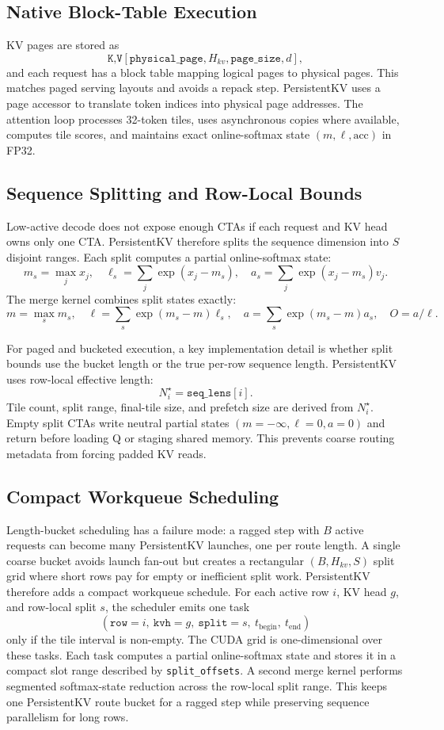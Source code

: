 \documentclass[10pt]{article}
\begin{document}
\subsection{Native Block-Table Execution}

KV pages are stored as
\[
\texttt{K,V}[\texttt{physical\_page}, H_{kv}, \texttt{page\_size}, d],
\]
and each request has a block table mapping logical pages to physical pages.
This matches paged serving layouts and avoids a repack step. PersistentKV uses
a page accessor to translate token indices into physical page addresses. The
attention loop processes 32-token tiles, uses asynchronous copies where
available, computes tile scores, and maintains exact online-softmax state
$(m,\ell,\mathrm{acc})$ in FP32.

\subsection{Sequence Splitting and Row-Local Bounds}

Low-active decode does not expose enough CTAs if each request and KV head owns
only one CTA. PersistentKV therefore splits the sequence dimension into
$S$ disjoint ranges. Each split computes a partial online-softmax state:
\[
m_s=\max_j x_j,\quad
\ell_s=\sum_j \exp(x_j-m_s),\quad
a_s=\sum_j \exp(x_j-m_s)v_j.
\]
The merge kernel combines split states exactly:
\[
m=\max_s m_s,\quad
\ell=\sum_s \exp(m_s-m)\ell_s,\quad
a=\sum_s \exp(m_s-m)a_s,\quad
O=a/\ell.
\]

For paged and bucketed execution, a key implementation detail is whether split
bounds use the bucket length or the true per-row sequence length. PersistentKV
uses row-local effective length:
\[
N^\star_i = \texttt{seq\_lens}[i].
\]
Tile count, split range, final-tile size, and prefetch size are derived from
$N^\star_i$. Empty split CTAs write neutral partial states
$(m=-\infty,\ell=0,a=0)$ and return before loading Q or staging shared memory.
This prevents coarse routing metadata from forcing padded KV reads.

\subsection{Compact Workqueue Scheduling}

Length-bucket scheduling has a failure mode: a ragged step with $B$ active
requests can become many PersistentKV launches, one per route length. A single
coarse bucket avoids launch fan-out but creates a rectangular
$(B,H_{kv},S)$ split grid where short rows pay for empty or inefficient split
work. PersistentKV therefore adds a compact workqueue schedule. For each active
row $i$, KV head $g$, and row-local split $s$, the scheduler emits one task
\[
(\texttt{row}=i,\ \texttt{kvh}=g,\ \texttt{split}=s,\ t_{\mathrm{begin}},\
t_{\mathrm{end}})
\]
only if the tile interval is non-empty. The CUDA grid is one-dimensional over
these tasks. Each task computes a partial online-softmax state and stores it in
a compact slot range described by \texttt{split\_offsets}. A second merge kernel
performs segmented softmax-state reduction across the row-local split range.
This keeps one PersistentKV route bucket for a ragged step while preserving
sequence parallelism for long rows.
\end{document}
